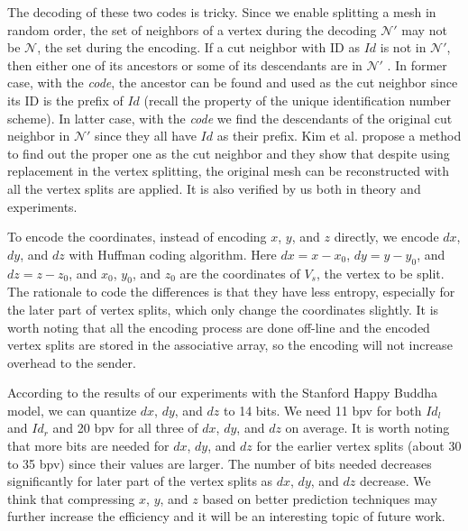     The decoding of these two codes is tricky. %
    Since we enable splitting a mesh in random order, the set of neighbors of a vertex
    during the decoding $\mathcal{N}'$ may not be $\mathcal{N}$, the set during the encoding.
    If a cut neighbor with ID as $Id$ %
    is not in $\mathcal{N}'$, then either one of its 
    ancestors or some of its descendants are in $\mathcal{N}'$ \cite{multiresolution:kim}.
    In former case, with the \emph{code}, the ancestor can be found and used as 
    the cut neighbor since its ID is the prefix of $Id$ 
    (recall the property of the unique identification number scheme).
    In latter case, with the \emph{code} we find the descendants of the original 
    cut neighbor in $\mathcal{N}'$ since they all have $Id$ as their prefix.
    Kim et al. \cite{multiresolution:kim} propose a method to find out the 
    proper one as the cut neighbor and they show that despite using replacement
    in the vertex splitting, the original mesh can be 
    reconstructed with all the vertex splits are applied. It is also verified 
    by us both in theory and experiments.
    
    To encode the coordinates, instead of encoding $x$, $y$, and $z$ directly, 
    we encode $dx$, $dy$, and $dz$ with Huffman coding algorithm. 
    Here $dx = x - x_0$, $dy = y - y_0$, 
    and $dz = z - z_0$, and $x_0$, $y_0$, and $z_0$ are the coordinates of
    $V_s$, the vertex to be split. 
    The rationale to code the differences is that they have less entropy, especially
    for the later part of vertex splits, which only change the coordinates slightly.
    It is worth noting that all the encoding process are done off-line and the 
    encoded vertex splits are stored in the associative array, so the encoding will
    not increase overhead to the sender.

    According to the results of our experiments with the Stanford Happy Buddha model,
    we can quantize $dx$, $dy$, and $dz$ to 14 bits. 
    We need 11 bpv for both $Id_l$ and $Id_r$ 
    and 20 bpv for all three of $dx$, $dy$, and $dz$ on average.
    It is worth noting that more bits are needed for $dx$, $dy$, and $dz$ 
    for the earlier vertex splits (about 30 to 35 bpv)
    since their values are larger. 
    The number of bits needed decreases significantly for later part of the vertex splits
    as $dx$, $dy$, and $dz$ decrease. We think that compressing $x$, $y$, and $z$ 
    based on better prediction techniques may further increase the 
    efficiency and it will be an interesting topic of future work.

